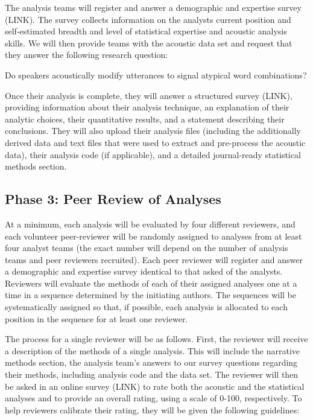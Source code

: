 \documentclass[
  12pt,
]{article}
\begin{document}
The analysis teams will register and answer a demographic and expertise survey (LINK).
The survey collects information on the analysts current position and self-estimated breadth and level of statistical expertise and acoustic analysis skills.
We will then provide teams with the acoustic data set and request that they answer the following research question:

Do speakers acoustically modify utterances to signal atypical word combinations?

Once their analysis is complete, they will answer a structured survey (LINK), providing information about their analysis technique, an explanation of their analytic choices, their quantitative results, and a statement describing their conclusions.
They will also upload their analysis files (including the additionally derived data and text files that were used to extract and pre-process the acoustic data), their analysis code (if applicable), and a detailed journal-ready statistical methods section.

\hypertarget{phase-3-peer-review-of-analyses}{%
\subsection{Phase 3: Peer Review of Analyses}\label{phase-3-peer-review-of-analyses}}

At a minimum, each analysis will be evaluated by four different reviewers, and each volunteer peer-reviewer will be randomly assigned to analyses from at least four analyst teams (the exact number will depend on the number of analysis teams and peer reviewers recruited).
Each peer reviewer will register and answer a demographic and expertise survey identical to that asked of the analysts.
Reviewers will evaluate the methods of each of their assigned analyses one at a time in a sequence determined by the initiating authors.
The sequences will be systematically assigned so that, if possible, each analysis is allocated to each position in the sequence for at least one reviewer.

The process for a single reviewer will be as follows.
First, the reviewer will receive a description of the methods of a single analysis.
This will include the narrative methods section, the analysis team's answers to our survey questions regarding their methods, including analysis code and the data set.
The reviewer will then be asked in an online survey (LINK) to rate both the acoustic and the statistical analyses and to provide an overall rating, using a scale of 0-100, respectively.
To help reviewers calibrate their rating, they will be given the following guidelines:
\end{document}
